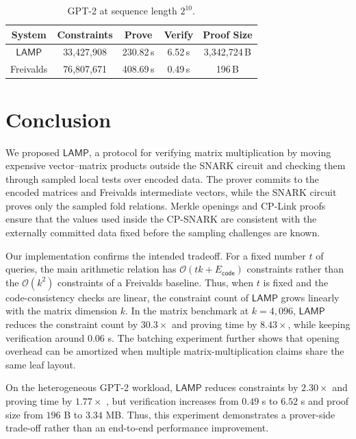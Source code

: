 \documentclass[conference,compsoc]{IEEEtran}
\newcommand{\protocol}{\textsf{LAMP}}   %
\theoremstyle{plain}
\theoremstyle{definition}
\theoremstyle{remark}
\providecommand{\DIFaddtex}[1]{{\protect\color{DIFADD} \sf #1}} %
\providecommand{\DIFaddbegin}{} %
\providecommand{\DIFaddend}{} %
\providecommand{\DIFadd}[1]{\texorpdfstring{\DIFaddtex{#1}}{#1}} %
\providecommand{\DIFaddincludegraphics}[2][]{{\color{blue}\fbox{\DIFOincludegraphics[#1]{#2}}}} %
\DeclareRobustCommand{\DIFaddbegin}{\DIFOaddbegin \let\includegraphics\DIFaddincludegraphics} %
\DeclareRobustCommand{\DIFaddend}{\DIFOaddend \let\includegraphics\DIFOincludegraphics} %
\begin{document}
\begin{table}[H]
\centering
\setlength{\tabcolsep}{3pt}
\begin{tabular*}{\columnwidth}{@{\extracolsep{\fill}}ccccc@{}}
\toprule
\textbf{System} & \textbf{Constraints} & \textbf{Prove} & \textbf{Verify} & \textbf{Proof Size} \\
\midrule
\(\protocol\) & 33{,}427{,}908 & 230.82\,s & 6.52\,s & 3{,}342{,}724\,B \\
Freivalds & 76{,}807{,}671 & 408.69\,s & 0.49\,s & 196\,B \\
\bottomrule
\end{tabular*}
\vspace{6pt}
\caption{GPT-2 at sequence length \(2^{10}\).}
\label{tab:lamp-gpt2}
\end{table}


\section{Conclusion}
\label{sec:conclusion}

We proposed \(\protocol\), a protocol for verifying matrix multiplication by
moving expensive vector--matrix products outside the SNARK circuit and checking
them through sampled local tests over encoded data.  The prover commits to the
encoded matrices and Freivalds intermediate vectors, while the SNARK circuit
proves only the sampled fold relations.  Merkle openings and CP-Link proofs
ensure that the values used inside the CP-SNARK are consistent with the
externally committed data fixed before the sampling challenges are known.

Our implementation confirms the intended tradeoff.  For a fixed number \(t\) of
queries, the main arithmetic relation has
\(\mathcal{O}(tk+E_{\mathsf{code}})\) constraints rather than the
\(\mathcal{O}(k^2)\) constraints of a Freivalds baseline.  Thus, when \(t\) is
fixed and the code-consistency checks are linear, the constraint count of
\(\protocol\) grows linearly with the matrix dimension \(k\).  In the matrix
benchmark at \(k=4{,}096\), \(\protocol\) reduces the constraint count by
\(30.3\times\) and proving time by \(8.43\times\), while keeping verification
around \(0.06\) s.  The batching experiment further shows that opening overhead
can be amortized when multiple matrix-multiplication claims share the same leaf
layout.

 \DIFaddbegin \DIFadd{On the heterogeneous }\DIFaddend GPT-2  \DIFaddbegin \DIFadd{workload}\DIFaddend , \(\protocol\)  \DIFaddbegin \DIFadd{reduces constraints by
}\DIFaddend \(2.30\times\)  \DIFaddbegin \DIFadd{and proving time by }\DIFaddend \(1.77\times\) \DIFaddbegin \DIFadd{, but verification increases
from \(0.49\) s to \(6.52\) s and proof size from \(196\) B to \(3.34\) MB.
Thus, this experiment demonstrates a prover-side trade-off rather than an
end-to-end performance improvement}\DIFaddend .
\end{document}
